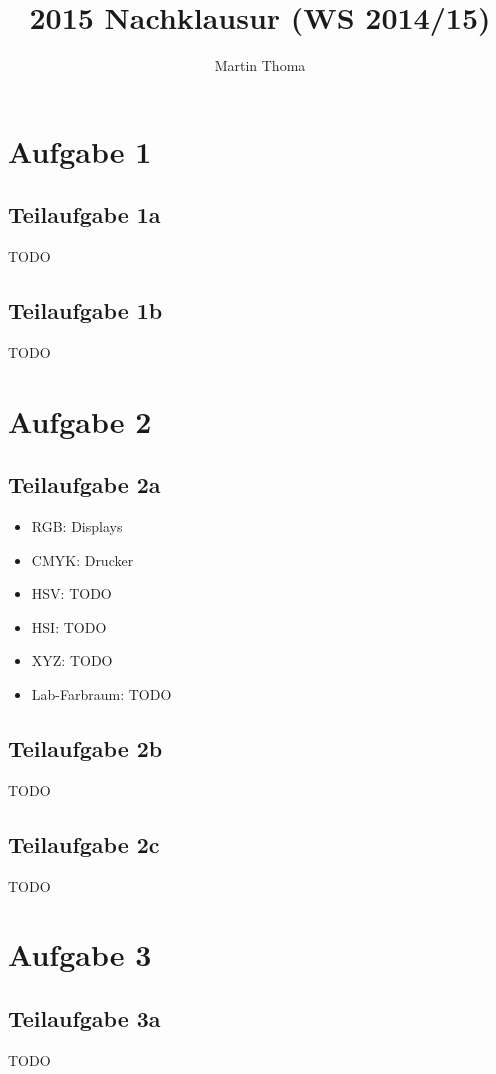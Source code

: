 \documentclass[a4paper]{scrartcl}
\begin{document}
\title{2015 Nachklausur (WS 2014/15)}
\author{Martin Thoma}

\setcounter{section}{1}
\section*{Aufgabe 1}
\subsection*{Teilaufgabe 1a}
TODO
\subsection*{Teilaufgabe 1b}
TODO

\section*{Aufgabe 2}
\subsection*{Teilaufgabe 2a}

\begin{itemize}
    \item RGB: Displays
    \item CMYK: Drucker
    \item HSV: TODO
    \item HSI: TODO
    \item XYZ: TODO
    \item Lab-Farbraum: TODO
\end{itemize}

\subsection*{Teilaufgabe 2b}
TODO

\subsection*{Teilaufgabe 2c}
TODO

\section*{Aufgabe 3}
\subsection*{Teilaufgabe 3a}
TODO
\end{document}
